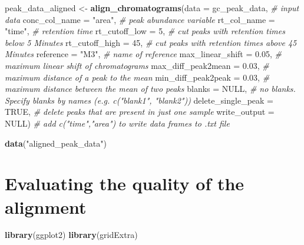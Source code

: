 \documentclass[]{article}
\newenvironment{Shaded}{}{}
\newcommand{\KeywordTok}[1]{\textbf{{#1}}}
\newcommand{\DataTypeTok}[1]{\textcolor[rgb]{0.50,0.00,0.00}{{#1}}}
\newcommand{\DecValTok}[1]{\textcolor[rgb]{0.00,0.00,1.00}{{#1}}}
\newcommand{\FloatTok}[1]{\textcolor[rgb]{0.50,0.00,0.50}{{#1}}}
\newcommand{\StringTok}[1]{\textcolor[rgb]{0.87,0.00,0.00}{{#1}}}
\newcommand{\CommentTok}[1]{\textcolor[rgb]{0.50,0.50,0.50}{\textit{{#1}}}}
\newcommand{\OtherTok}[1]{{#1}}
\newcommand{\NormalTok}[1]{{#1}}
\begin{document}
\begin{Shaded}
\begin{Highlighting}[]
\NormalTok{peak_data_aligned <-}\StringTok{ }\KeywordTok{align_chromatograms}\NormalTok{(}\DataTypeTok{data =} \NormalTok{gc_peak_data, }\CommentTok{# input data}
    \DataTypeTok{conc_col_name =} \StringTok{"area"}\NormalTok{, }\CommentTok{# peak abundance variable}
    \DataTypeTok{rt_col_name =} \StringTok{"time"}\NormalTok{, }\CommentTok{# retention time }
    \DataTypeTok{rt_cutoff_low =} \DecValTok{5}\NormalTok{, }\CommentTok{# cut peaks with retention times below 5 Minutes}
    \DataTypeTok{rt_cutoff_high =} \DecValTok{45}\NormalTok{, }\CommentTok{# cut peaks with retention times above 45 Minutes}
    \DataTypeTok{reference =} \StringTok{"M3"}\NormalTok{, }\CommentTok{# name of reference }
    \DataTypeTok{max_linear_shift =} \FloatTok{0.05}\NormalTok{, }\CommentTok{# maximum linear shift of chromatograms}
    \DataTypeTok{max_diff_peak2mean =} \FloatTok{0.03}\NormalTok{, }\CommentTok{# maximum distance of a peak to the mean}
    \DataTypeTok{min_diff_peak2peak =} \FloatTok{0.03}\NormalTok{, }\CommentTok{# maximum distance between the mean of two peaks}
    \DataTypeTok{blanks =} \OtherTok{NULL}\NormalTok{, }\CommentTok{# no blanks. Specify blanks by names (e.g. c("blank1", "blank2"))}
    \DataTypeTok{delete_single_peak =} \OtherTok{TRUE}\NormalTok{, }\CommentTok{# delete peaks that are present in just one sample }
    \DataTypeTok{write_output =} \OtherTok{NULL}\NormalTok{) }\CommentTok{# add c("time","area") to write data frames to .txt file}
\end{Highlighting}
\end{Shaded}

\begin{Shaded}
\begin{Highlighting}[]
\KeywordTok{data}\NormalTok{(}\StringTok{"aligned_peak_data"}\NormalTok{)}
\end{Highlighting}
\end{Shaded}

\section{Evaluating the quality of the
alignment}\label{evaluating-the-quality-of-the-alignment}

\begin{Shaded}
\begin{Highlighting}[]
\KeywordTok{library}\NormalTok{(ggplot2)}
\KeywordTok{library}\NormalTok{(gridExtra)}
\end{Highlighting}
\end{Shaded}
\end{document}
